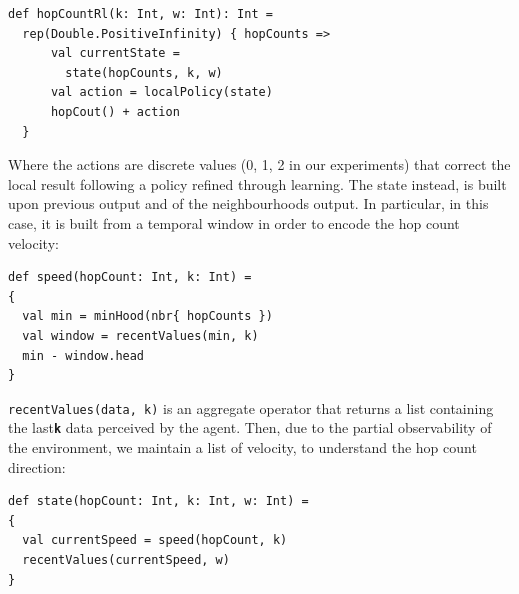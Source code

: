 \documentclass[conference]{IEEEtran}
\begin{document}
 \begin{verbatim}
def hopCountRl(k: Int, w: Int): Int = 
  rep(Double.PositiveInfinity) { hopCounts => 
      val currentState = 
        state(hopCounts, k, w)
      val action = localPolicy(state)
      hopCout() + action
  }
\end{verbatim}

Where the actions are discrete values (0, 1, 2 in our experiments) that correct the local result following a policy refined through learning.
%
The state instead, is built upon previous output and of the neighbourhoods output.
 In particular, in this case, it is built from a temporal window in order to encode the hop count velocity:
\begin{verbatim}
def speed(hopCount: Int, k: Int) =
{
  val min = minHood(nbr{ hopCounts })
  val window = recentValues(min, k)
  min - window.head 
}
\end{verbatim}
\texttt{recentValues(data, k)} is an aggregate operator that returns a list containing the last\textbf{\texttt{k}} data perceived by the agent.
Then, due to the partial observability of the environment, we maintain a 
 list of velocity, to understand the hop count direction:

 \begin{verbatim}
def state(hopCount: Int, k: Int, w: Int) =
{
  val currentSpeed = speed(hopCount, k)
  recentValues(currentSpeed, w)
}
\end{verbatim}
\end{document}
